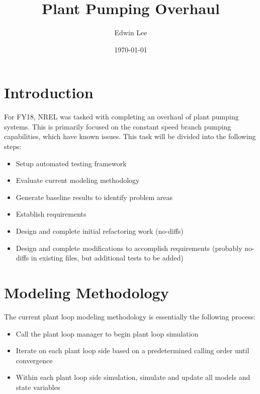 \documentclass{report}
\title{Plant Pumping Overhaul}
\author{Edwin Lee}
\date{\today}
\begin{document}
    \maketitle

    \tableofcontents

    \chapter{Introduction}\label{ch:intro}

        For FY18, NREL was tasked with completing an overhaul of plant pumping systems.
        This is primarily focused on the constant speed branch pumping capabilities, which have known issues.
        This task will be divided into the following steps:

        \begin{itemize}
            \item Setup automated testing framework
            \item Evaluate current modeling methodology
            \item Generate baseline results to identify problem areas
            \item Establish requirements
            \item Design and complete initial refactoring work (no-diffs)
            \item Design and complete modifications to accomplish requirements (probably no-diffs in existing files, but additional tests to be added)
        \end{itemize}

    \chapter{Modeling Methodology}\label{ch:modeling}

        The current plant loop modeling methodology is essentially the following process:

        \begin{itemize}
            \item Call the plant loop manager to begin plant loop simulation
            \item Iterate on each plant loop side based on a predetermined calling order until convergence
            \item Within each plant loop side simulation, simulate and update all models and state variables
        \end{itemize}
\end{document}
